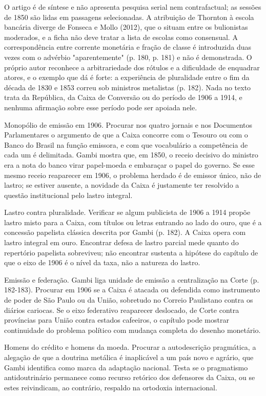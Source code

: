 O artigo é de síntese e não apresenta pesquisa serial nem contrafactual; as
sessões de 1850 são lidas em passagens selecionadas. A atribuição de Thornton à
escola bancária diverge de Fonseca e Mollo (2012), que o situam entre os
bulionistas moderados, e a ficha não deve tratar a lista de escolas como
consensual. A correspondência entre corrente monetária e fração de classe é
introduzida duas vezes com o advérbio "aparentemente" (p. 180, p. 181) e não é
demonstrada. O próprio autor reconhece a arbitrariedade dos rótulos e a
dificuldade de enquadrar atores, e o exemplo que dá é forte: a experiência de
pluralidade entre o fim da década de 1830 e 1853 correu sob ministros metalistas
(p. 182). Nada no texto trata da República, da Caixa de Conversão ou do período
de 1906 a 1914, e nenhuma afirmação sobre esse período pode ser apoiada nele.

\begin{dialogo}
\item Monopólio de emissão em 1906. Procurar nos quatro jornais e nos
Documentos Parlamentares o argumento de que a Caixa concorre com o Tesouro ou
com o Banco do Brasil na função emissora, e com que vocabulário a competência
de cada um é delimitada. Gambi mostra que, em 1850, o receio decisivo do
ministro era a nota do banco virar papel-moeda e embaraçar o papel do governo.
Se esse mesmo receio reaparecer em 1906, o problema herdado é de emissor único,
não de lastro; se estiver ausente, a novidade da Caixa é justamente ter
resolvido a questão institucional pelo lastro integral.

\item Lastro contra pluralidade. Verificar se algum publicista de 1906 a 1914
propõe lastro misto para a Caixa, com títulos ou letras entrando ao lado do
ouro, que é a concessão papelista clássica descrita por Gambi (p. 182). A Caixa
opera com lastro integral em ouro. Encontrar defesa de lastro parcial mede
quanto do repertório papelista sobreviveu; não encontrar sustenta a hipótese do
capítulo de que o eixo de 1906 é o nível da taxa, não a natureza do lastro.

\item Emissão e federação. Gambi liga unidade de emissão a centralização na
Corte (p. 182-183). Procurar em 1906 se a Caixa é atacada ou defendida como
instrumento de poder de São Paulo ou da União, sobretudo no Correio Paulistano
contra os diários cariocas. Se o eixo federativo reaparecer deslocado, de Corte
contra províncias para União contra estados cafeeiros, o capítulo pode mostrar
continuidade do problema político com mudança completa do desenho monetário.

\item Homens do crédito e homens da moeda. Procurar a autodescrição pragmática,
a alegação de que a doutrina metálica é inaplicável a um país novo e agrário,
que Gambi identifica como marca da adaptação nacional. Testa se o pragmatismo
antidoutrinário permanece como recurso retórico dos defensores da Caixa, ou se
estes reivindicam, ao contrário, respaldo na ortodoxia internacional.
\end{dialogo}


